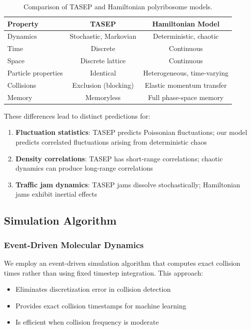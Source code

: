 \documentclass[11pt]{article}
\begin{document}
\begin{table}[h]
\centering
\begin{tabular}{lcc}
\toprule
\textbf{Property} & \textbf{TASEP} & \textbf{Hamiltonian Model} \\
\midrule
Dynamics & Stochastic, Markovian & Deterministic, chaotic \\
Time & Discrete & Continuous \\
Space & Discrete lattice & Continuous \\
Particle properties & Identical & Heterogeneous, time-varying \\
Collisions & Exclusion (blocking) & Elastic momentum transfer \\
Memory & Memoryless & Full phase-space memory \\
\bottomrule
\end{tabular}
\caption{Comparison of TASEP and Hamiltonian polyribosome models.}
\label{tab:tasep_comparison}
\end{table}

These differences lead to distinct predictions for:
\begin{enumerate}[nosep]
    \item \textbf{Fluctuation statistics}: TASEP predicts Poissonian fluctuations; our model predicts correlated fluctuations arising from deterministic chaos
    \item \textbf{Density correlations}: TASEP has short-range correlations; chaotic dynamics can produce long-range correlations
    \item \textbf{Traffic jam dynamics}: TASEP jams dissolve stochastically; Hamiltonian jams exhibit inertial effects
\end{enumerate}

\subsection{Simulation Algorithm}

\subsubsection{Event-Driven Molecular Dynamics}

We employ an event-driven simulation algorithm that computes exact collision times rather than using fixed timestep integration. This approach:
\begin{itemize}[nosep]
    \item Eliminates discretization error in collision detection
    \item Provides exact collision timestamps for machine learning
    \item Is efficient when collision frequency is moderate
\end{itemize}
\end{document}
